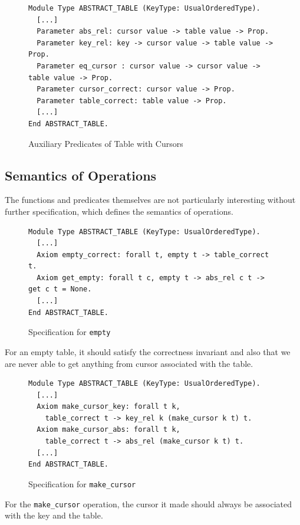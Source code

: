 \documentclass[runningheads]{llncs}
\begin{document}
\begin{figure}[htbp]
  \centering
  \begin{verbatim}
Module Type ABSTRACT_TABLE (KeyType: UsualOrderedType).
  [...]
  Parameter abs_rel: cursor value -> table value -> Prop.
  Parameter key_rel: key -> cursor value -> table value -> Prop.
  Parameter eq_cursor : cursor value -> cursor value -> table value -> Prop.
  Parameter cursor_correct: cursor value -> Prop.
  Parameter table_correct: table value -> Prop.
  [...]
End ABSTRACT_TABLE.
\end{verbatim}
  \caption{Auxiliary Predicates of Table with Cursors}\label{fig:aux}
\end{figure}

\subsection{Semantics of Operations}

The functions and predicates themselves are not particularly interesting without
further specification, which defines the semantics of operations.

\begin{figure}[htbp]
  \centering
  \begin{verbatim}
Module Type ABSTRACT_TABLE (KeyType: UsualOrderedType).
  [...]
  Axiom empty_correct: forall t, empty t -> table_correct t.
  Axiom get_empty: forall t c, empty t -> abs_rel c t -> get c t = None.
  [...]
End ABSTRACT_TABLE.
\end{verbatim}
  \caption{Specification for \texttt{empty}}\label{fig:empty}
\end{figure}

For an empty table, it should satisfy the correctness invariant and also that we
are never able to get anything from cursor associated with the table. 

\begin{figure}[htbp]
  \centering
  \begin{verbatim}
Module Type ABSTRACT_TABLE (KeyType: UsualOrderedType).
  [...]
  Axiom make_cursor_key: forall t k,
    table_correct t -> key_rel k (make_cursor k t) t.
  Axiom make_cursor_abs: forall t k,
    table_correct t -> abs_rel (make_cursor k t) t.
  [...]
End ABSTRACT_TABLE.
\end{verbatim}
  \caption{Specification for \texttt{make\_cursor}}\label{fig:make}
\end{figure}

For the \texttt{make\_cursor} operation, the cursor it made should always be
associated with the key and the table.
\end{document}
